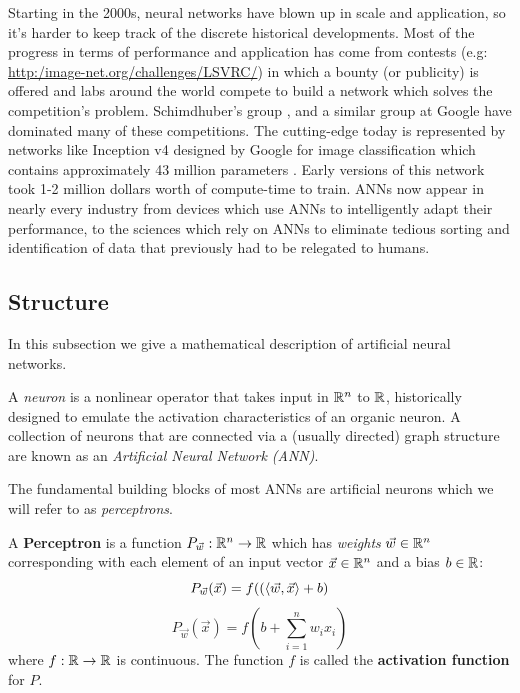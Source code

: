 Starting in the 2000s, neural networks have blown up in scale and application, so it's harder to keep track of the discrete historical developments. Most of the progress in terms of performance and application has come from contests (e.g: \url{http:/image-net.org/challenges/LSVRC/}) in which a bounty (or publicity) is offered and labs around the world compete to build a network which solves the competition's problem. Schimdhuber's group \cite{SCHMIDHUBER201585}, and a similar group at Google have dominated many of these competitions. The cutting-edge today is represented by networks like Inception v4 designed by Google for image classification  which contains approximately 43 million parameters  \cite{Szegedy2013}. Early versions of this network took 1-2 million dollars worth of compute-time to train. ANNs now appear in nearly every industry from devices which use ANNs to intelligently adapt their performance, to the sciences which rely on ANNs to eliminate tedious sorting and identification of data that previously had to be relegated to humans.

\subsection{Structure}
In this subsection we give a mathematical description of artificial neural networks. 

A \emph{neuron} is a nonlinear operator that takes input in $\mathbb{R}^n$ to $\mathbb{R}$, historically designed to emulate the activation characteristics of an organic neuron. A collection of neurons that are connected via a (usually directed) graph structure are known as an \emph{Artificial Neural Network (ANN)}. 

The fundamental building blocks of most ANNs are artificial neurons which we will refer to as \emph{perceptrons}.

\begin{definition}{A \textbf{Perceptron} is  }
\label{perceptron}
a function $P_{\vec w}: \mathbb{R}^n \to \mathbb{R}$ which has \emph{weights} $\vec
w \in \mathbb{R}^n$ corresponding with each element of an input vector $\vec
x\in \mathbb{R}^n$ and a bias $b \in \mathbb{R}$:
\[P_{\vec w}(\vec x) = f(\left(\left\langle \vec w,\vec x \right\rangle + b\right)\]
\[P_{\vec w}(\vec x) = f\left(b + \sum_{i = 1}^n w_i x_i\right)\]
where $f: \mathbb{R} \to \mathbb{R}$ is continuous. The function $f$ is called the \textbf{activation function} for $P$. 
\end{definition}



